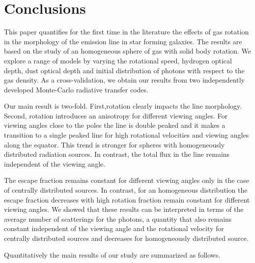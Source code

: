 \documentclass{emulateapj}
\newcommand{\ly}{{\ifmmode{{\rm Ly}\alpha~}\else{Ly$\alpha$~}\fi}}
\begin{document}
 

\section{Conclusions}
\label{sec:conclusions}

This paper quantifies for the first time in the literature the effects
of gas rotation in the morphology of the \ly emission line in star forming
galaxies.  The results are based on the study of an homogeneous sphere
of gas with solid body rotation. We explore a range of models by varying
the rotational speed, hydrogen optical depth, dust optical depth and
initial distribution of \ly photons with respect to the gas
density. As a cross-validation, we obtain our results from two
independently developed Monte-Carlo radiative transfer codes. 

Our main result is two-fold. First,rotation clearly impacts the \ly line
morphology. Second, rotation introduces an anisotropy for different
viewing angles. For viewing angles close to the poles the line is
double peaked and it makes a transition to a single peaked line for
high rotational velocities and viewing angles along the equator. This
trend is stronger for spheres with homogeneously distributed radiation
sources.  In contrast, the total flux in the line remains independent
of the viewing angle.  

The escape fraction remains constant for different viewing angles only
in the case of centrally distributed sources. In contrast, for an homogeneous
distribution the escape fraction decreases with high rotation 
fraction remain constant for different viewing angles. We showed that
these results can be interpreted in terms of the average number of
scatterings for the photons, a quantity that also remains constant
independent of the viewing angle and the rotational velocity for
centrally distributed sources and decreases for homogeneously
distributed source.


Quantitatively the main results of our study are summarized as
follows. 
\end{document}
